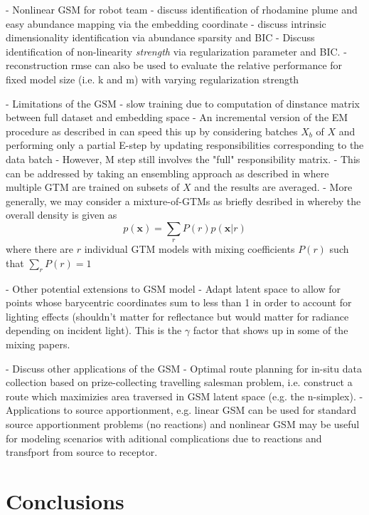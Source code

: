 \documentclass[remotesensing,article,submit,pdftex,moreauthors]{Definitions/mdpi}
\begin{document}
- Nonlinear GSM for robot team 
    - discuss identification of rhodamine plume and easy abundance mapping via the embedding coordinate
    - discuss intrinsic dimensionality identification via abundance sparsity and BIC
    - Discuss identification of non-linearity \textit{strength} via regularization parameter and BIC.
    - reconstruction rmse can also be used to evaluate the relative performance for fixed model size (i.e. k and m) with varying regularization strength

- Limitations of the GSM
    - slow training due to computation of dinstance matrix between full dataset and embedding space
    - An incremental version of the EM procedure as described in \cite{gtm-developments} can speed this up by considering batches $X_b$ of $X$ and performing only a partial E-step by updating responsibilities corresponding to the data batch
    - However, M step still involves the "full" responsibility matrix. 
    - This can be addressed by taking an ensembling approach as described in \cite{parallel-gtm} where multiple GTM are trained on subsets of $X$ and the results are averaged. 
    - More generally, we may consider a mixture-of-GTMs as briefly desribed in \cite{gtm-orig} whereby the overall density is given as 
    \begin{equation}
        p(\mathbf{x}) = \sum_r P(r)p(\mathbf{x}\vert r)
    \end{equation}
    where there are $r$ individual GTM models with mixing coefficients $P(r)$ such that $\sum_r P(r) =1$

- Other potential extensions to GSM model
     - Adapt latent space  to allow for points whose barycentric coordinates sum to less than 1 in order to account for lighting effects (shouldn't matter for reflectance but would matter for radiance depending on incident light). This is the $\gamma$ factor that shows up in some of the mixing papers.

- Discuss other applications of the GSM
    - Optimal route planning for in-situ data collection based on prize-collecting travelling salesman problem, i.e. construct a route which maximizies area traversed in GSM latent space (e.g. the n-simplex). 
    - Applications to source apportionment, e.g. linear GSM can be used for standard source apportionment problems (no reactions) and nonlinear GSM may be useful for modeling scenarios with aditional complications due to reactions and transfport from source to receptor.

\section{Conclusions}
\end{document}

